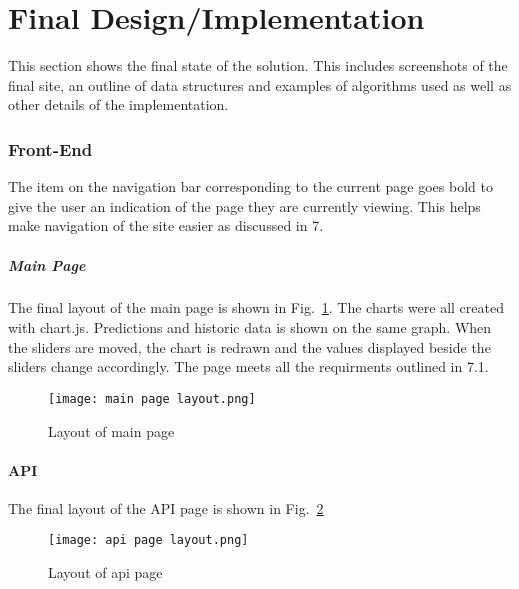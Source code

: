 \newpage
\part{Final Design/Implementation}

    This section shows the final state of the solution. This includes screenshots of the final site, an outline of data structures and examples of algorithms used as well as other details of the implementation.

    \graphicspath{{images/finalDesign/}}

    \section{Front-End}

        The item on the navigation bar corresponding to the current page goes bold to give the user an indication of the page they are currently viewing. This helps make navigation of the site easier as discussed in 7.

        \subsubsection{Main Page}

        The final layout of the main page is shown in Fig.~\ref{fig:main_page_layout}. The charts were all created with chart.js. Predictions and historic data is shown on the same graph. When the sliders are moved, the chart is redrawn and the values displayed beside the sliders change accordingly. The page meets all the requirments outlined in 7.1.

        \begin{figure}[htbp]
            \centering
            \texttt{[image: main page layout.png]}
            \caption{Layout of main page}
            \label{fig:main_page_layout}
        \end{figure}

        \subsection{API}

            The final layout of the API page is shown in Fig.~\ref{fig:api_page_layout}

            \begin{figure}[htbp]
                \centering
                \texttt{[image: api page layout.png]}
                \caption{Layout of api page}
                \label{fig:api_page_layout}
            \end{figure}

